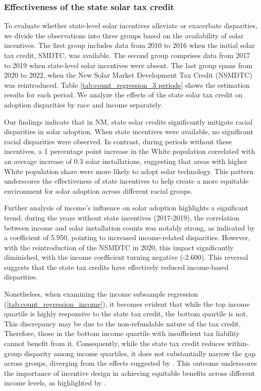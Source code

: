 \documentclass[11pt,twoside,letterpaper]{article}
\begin{document}
\subsubsection{Effectiveness of the state solar tax credit}

To evaluate whether state-level solar incentives alleviate or exacerbate disparities, we divide the observations into three groups based on the availability of solar incentives. The first group includes data from 2010 to 2016 when the initial solar tax credit, SMDTC, was available. The second group comprises data from 2017 to 2019 when state-level solar incentives were absent. The last group spans from 2020 to 2022, when the New Solar Market Development Tax Credit (NSMDTC) was reintroduced. Table \ref{tab:count_regression_3 periods} shows the estimation results for each period. We analyze the effects of the state solar tax credit on adoption disparities by race and income separately.


Our findings indicate that in NM, state solar credits significantly mitigate racial disparities in solar adoption. When state incentives were available, no significant racial disparities were observed. In contrast, during periods without these incentives, a 1 percentage point increase in the White population correlated with an average increase of 0.3 solar installations, suggesting that areas with higher White population share were more likely to adopt solar technology. This pattern underscores the effectiveness of state incentives to help create a more equitable environment for solar adoption across different racial groups. 

Further analysis of income’s influence on solar adoption highlights a significant trend: during the years without state incentives (2017-2019), the correlation between income and solar installation counts was notably strong, as indicated by a coefficient of 5.950, pointing to increased income-related disparities. However, with the reintroduction of the NSMDTC in 2020, this impact significantly diminished, with the income coefficient turning negative (-2.600). This reversal suggests that the state tax credits have effectively reduced income-based disparities. 

Nonetheless, when examining the income subsample regression (\autoref{tab:count_regression_income}), it becomes evident that while the top income quartile is highly responsive to the state tax credit, the bottom quartile is not. This discrepancy may be due to the non-refundable nature of the tax credit. Therefore, those in the bottom income quartile with insufficient tax liability cannot benefit from it. Consequently, while the state tax credit reduces within-group disparity among income quartiles, it does not substantially narrow the gap across groups, diverging from the effects suggested by \textcite{oshaughnessy_rooftop_2022}. This outcome underscores the importance of incentive design in achieving equitable benefits across different income levels, as highlighted by \textcite{borenstein_distributional_2016}.
\end{document}
